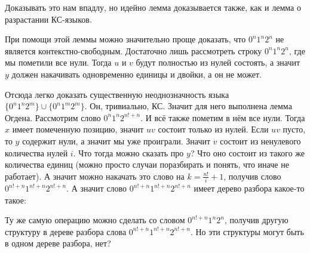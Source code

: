 \documentclass{article}
\begin{document}
\begin{itemize}
\begin{Proof}
            Доказывать это нам впадлу, но идейно лемма доказывается также, как и лемма о разрастании КС-языков.
        \end{Proof}
        \begin{Comment}
            При помощи этой леммы можно значительно проще доказать, что $0^n1^n2^n$ не является контекстно-свободным. Достаточно лишь рассмотреть строку $0^n1^n2^n$, где мы пометили все нули. Тогда $u$ и $v$ будут полностью из нулей состоять, а значит $y$ должен накачивать одновременно единицы и двойки, а он не может.
        \end{Comment}
        \begin{Example}
            Отсюда легко доказать существенную неоднозначность языка $\{0^n1^n2^m\}\cup\{0^n1^m2^m\}$. Он, тривиально, КС. Значит для него выполнена лемма Огдена. Рассмотрим слово $0^n1^n2^{n!+n}$. И всё также пометим в нём все нули. Тогда $x$ имеет помеченную позицию, значит $uv$ состоит только из нулей. Если $uv$ пусто, то $y$ содержит нули, а значит мы уже проиграли. Значит $v$ состоит из ненулевого количества нулей $i$. Что тогда можно сказать про $y$? Что оно состоит из такого же количества единиц (можно просто случаи поразбирать и понять, что иначе не работает). А значит можно накачать это слово на $k=\frac{n!}i+1$, получив слово $0^{n!+n}1^{n!+n}2^{n!+n}$. А значит слово $0^{n!+n}1^{n!+n}2^{n!+n}$ имеет дерево разбора какое-то такое:
            \begin{figure}[H]
            \end{figure}\noindent
            Ту же самую операцию можно сделать со словом $0^{n!+n}1^n2^n$, получив другую структуру в дереве разбора слова $0^{n!+n}1^{n!+n}2^{n!+n}$. Но эти структуры могут быть в одном дереве разбора, нет?
            \begin{figure}[H]
                \begin{tikzpicture}[scale=.5]

\end{tikzpicture}
\end{figure}
\end{Example}
\end{itemize}
\end{document}
